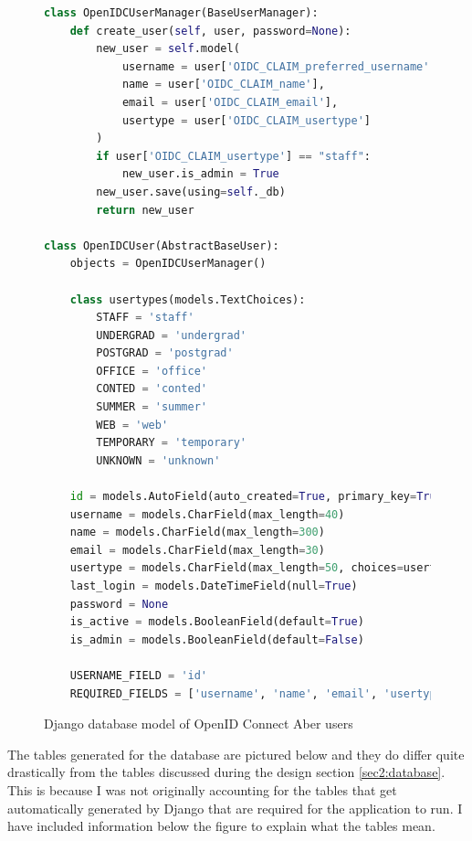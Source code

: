 \begin{figure}[H]
\begin{lstlisting}[language=Python]
class OpenIDCUserManager(BaseUserManager):
    def create_user(self, user, password=None):
        new_user = self.model(
            username = user['OIDC_CLAIM_preferred_username'],
            name = user['OIDC_CLAIM_name'],
            email = user['OIDC_CLAIM_email'],
            usertype = user['OIDC_CLAIM_usertype']
        )
        if user['OIDC_CLAIM_usertype'] == "staff":
            new_user.is_admin = True
        new_user.save(using=self._db)
        return new_user

class OpenIDCUser(AbstractBaseUser):
    objects = OpenIDCUserManager()

    class usertypes(models.TextChoices):
        STAFF = 'staff'
        UNDERGRAD = 'undergrad'
        POSTGRAD = 'postgrad'
        OFFICE = 'office'
        CONTED = 'conted'
        SUMMER = 'summer'
        WEB = 'web'
        TEMPORARY = 'temporary'
        UNKNOWN = 'unknown'

    id = models.AutoField(auto_created=True, primary_key=True, serialize=False)
    username = models.CharField(max_length=40)
    name = models.CharField(max_length=300)
    email = models.CharField(max_length=30)
    usertype = models.CharField(max_length=50, choices=usertypes.choices)
    last_login = models.DateTimeField(null=True)
    password = None
    is_active = models.BooleanField(default=True)
    is_admin = models.BooleanField(default=False)

    USERNAME_FIELD = 'id'
    REQUIRED_FIELDS = ['username', 'name', 'email', 'usertype']
\end{lstlisting}
\caption{Django database model of OpenID Connect Aber users}
\label{fig:django-database-code}
\end{figure}

The tables generated for the database are pictured below and they do differ quite drastically from the tables discussed during the design section \ref{sec2:database}. This is because I was not originally accounting for the tables that get automatically generated by Django \cite{Django} that are required for the application to run. I have included information below the figure to explain what the tables mean.

